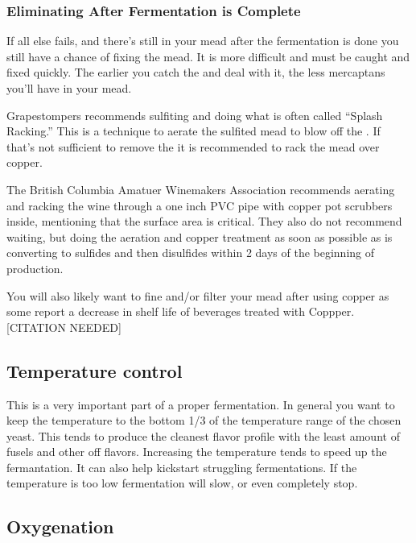 \documentclass{article}
\begin{document}
  \subsubsection{Eliminating After Fermentation is Complete}
   If all else fails, and there's still  in your mead after the fermentation is done you still have a 
   chance of fixing the mead. It is more difficult and must be caught and fixed quickly. The earlier you catch 
   the  and deal with it, the less mercaptans you'll have in your mead. 

   Grapestompers\cite{grapestompers-H2S}
   recommends sulfiting and doing what is often called  ``Splash Racking.'' This is a technique to aerate the 
   sulfited mead to blow off the . If that's not sufficient to remove the  it is recommended 
   to rack the mead over copper. 

   The British Columbia Amatuer Winemakers Association\cite{bcawa-H2S} recommends
   aerating and racking the wine through a one inch PVC pipe with copper pot scrubbers inside, mentioning that 
   the surface area is critical. They also do not recommend waiting, but doing the aeration and copper treatment 
   as soon as possible as  is converting to sulfides and then disulfides within 2 days of the 
   beginning of  production.

   You will also likely want to fine and/or filter your mead after using copper as some report a decrease in 
   shelf life of beverages treated with Coppper.[CITATION NEEDED]

 \subsection{Temperature control}
  This is a very important part of a proper fermentation. In general you want to keep the temperature to the 
  bottom 1/3 of the temperature range of the chosen yeast. This tends to produce the cleanest flavor profile with 
  the least amount of fusels and other off flavors. Increasing the temperature tends to speed up the fermantation.
  It can also help kickstart struggling fermentations. If the temperature is too low fermentation will slow, or 
  even completely stop.

 \subsection{Oxygenation}
\end{document}
